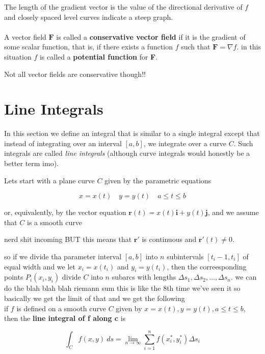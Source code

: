 \documentclass{article}
\begin{document}
The length of the gradient vector is the value of the directional derivative of $f$ and closely spaced level curves indicate a steep graph.
\\ 
\\
A vector field $\mathbf{F}$ is called a \textbf{conservative vector field} if it is the gradient of some scalar function, that is, if there exists a function $f$ such that $\mathbf{F} = \nabla f$. in this situation $f$ is called a \textbf{potential function} for \textbf{F}.

Not all vector fields are conservative though!!


\newpage
\section{Line Integrals}

In this section we define an integral that is similar to a single integral except that instead of integrating over an interval $[a,b]$, we integrate over a curve $C$. Such integrals are called \textit{line integrals} (although curve integrals would honestly be a better term imo).

Lets start with a plane curve $C$ given by the parametric equations

$$x = x(t) \quad y = y(t) \quad a \leq t \leq b$$

or, equivalently, by the vector equation $\mathbf{r}(t) = x(t)\mathbf{i} + y(t)\mathbf{j}$, and we assume that $C$ is a smooth curve

nerd shit incoming BUT this means that $\mathbf{r'}$ is continuous and $\mathbf{r}'(t) \neq 0$.

so if we divide tha parameter interval $[a,b]$ into $n$ subintervals $[t_i-1, t_i]$ of equal width and we let $x_i = x(t_i)$ and $y_i = y(t_i)$, then the correesponding points $P_i(x_i,y_i)$ divide $C$ into $n$ subarcs with lengths $\Delta s_1, \Delta s_2, \dots, \Delta s_n$. we can do the blah blah blah riemann sum this is like the 8th time we've seen it so basically we get the limit of that and we get the following \\ 

if $f$ is defined on a smooth curve $C$ given by $x = x(t), y = y(t), a \leq t \leq b$, then the \textbf{line integral of f along c} is 

\begin{equation*}
    \int_C f(x,y) \ ds = \lim_{n \rightarrow \infty} \sum_{i=1}^{n} f(x_i^*, y_i^*) \Delta s_i
\end{equation*}
\end{document}
